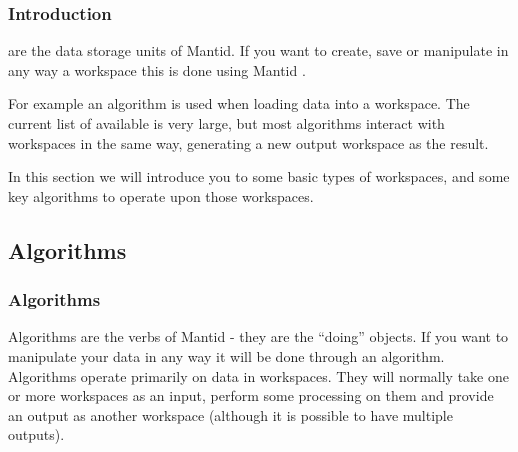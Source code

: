 \documentclass[letterpaper,10pt,english,openany]{sphinxmanual}
\begin{document}
\subsubsection{Introduction}
\label{\detokenize{mantid_basic_course/algorithms_workspaces_and_histories/01_introduction:id1}}
{\hyperref[\detokenize{mantid_basic_course/algorithms_workspaces_and_histories/03_workspaces:workspaces}]{}} are the data storage units of Mantid. If you
want to create, save or manipulate in any way a workspace this is done
using Mantid {\hyperref[\detokenize{mantid_basic_course/algorithms_workspaces_and_histories/02_algorithms:algorithms}]{}}.

For example an algorithm is used when loading data into a workspace. The
current list of available
 is very large,
but most algorithms interact with workspaces in the same way, generating
a new output workspace as the result.

In this section we will introduce you to some basic types of workspaces,
and some key algorithms to operate upon those workspaces.




\subsection{Algorithms}
\label{\detokenize{mantid_basic_course/algorithms_workspaces_and_histories/02_algorithms:algorithms}}\label{\detokenize{mantid_basic_course/algorithms_workspaces_and_histories/02_algorithms:id1}}\label{\detokenize{mantid_basic_course/algorithms_workspaces_and_histories/02_algorithms::doc}}

\subsubsection{Algorithms}
\label{\detokenize{mantid_basic_course/algorithms_workspaces_and_histories/02_algorithms:id2}}
\begin{figure}[H]
\centering

\noindent{}
\end{figure}

Algorithms are the verbs of Mantid - they are the “doing” objects. If
you want to manipulate your data in any way it will be done through an
algorithm. Algorithms operate primarily on data in workspaces. They will
normally take one or more workspaces as an input, perform some
processing on them and provide an output as another workspace (although
it is possible to have multiple outputs).
\end{document}
